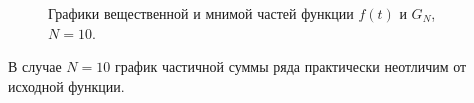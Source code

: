 \documentclass[a5paper, 10pt]{article}
\theoremstyle{definition}
\theoremstyle{plain}
\theoremstyle{remark}
\begin{document}
\begin{figure}[h]
\begin{minipage}[h]{0.5\linewidth}
\end{minipage}
\hfill
\begin{minipage}[h]{0.5\linewidth}
\end{minipage}
\caption{Графики вещественной и мнимой частей функции $f(t)$ и $G_N$, $N=10$.}
\end{figure}

\newpage
В случае $N=10$ график частичной суммы ряда практически неотличим от исходной функции.
\end{document}
